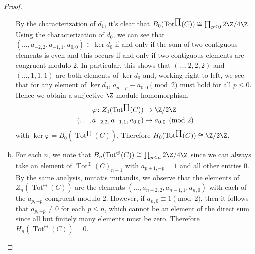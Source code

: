 \documentclass[10pt]{amsart}
\begin{document}
\begin{ex}
\begin{proof}
\begin{enumerate}[(a)]
      By the characterization of $d_1$, it's clear that $B_0(\operatorname{Tot}^{\prod}(C)) \cong \prod_{p \leq 0} 2\Z/4\Z$.
      Using the characterization of $d_0$, we can see that $(\ldots, a_{-2, 2}, a_{-1, 1}, a_{0, 0}) \in \ker d_0$ if and only if the sum of two contiguous elements is even and this occurs if and only if two contiguous elements are congruent modulo 2.
      In particular, this shows that $(\ldots, 2, 2, 2)$ and $(\ldots, 1, 1, 1)$ are both elements of $\ker d_0$ and, working right to left, we see that for any element of $\ker d_0$, $a_{p,-p} \equiv a_{0,0} \pmod{2}$ must hold for all $p \leq 0$.
      Hence we obtain a surjective $\Z$-module homomorphism
      \begin{align*}
        \varphi \colon Z_0(\operatorname{Tot}^{\prod}(C)) &\rightarrow \Z/2\Z\\
        (\ldots, a_{-2, 2}, a_{-1, 1}, a_{0, 0}) &\mapsto a_{0,0} \pmod{2}
      \end{align*}
      with $\ker\varphi = B_0(\operatorname{Tot}^{\prod}(C))$.
      Therefore $H_0(\operatorname{Tot}^{\prod}(C)) \cong \Z/2\Z$.
    \item
      For each $n$, we note that $B_n(\operatorname{Tot}^{\oplus}(C)) \cong \prod_{p \leq n} 2\Z/4\Z$ since we can always take an element of $\operatorname{Tot}^{\oplus}(C)_{n+1}$ with $a_{p+1, -p} = 1$ and all other entries 0.
      By the same analysis, mutatis mutandis, we observe that the elements of $Z_n(\operatorname{Tot}^{\oplus}(C))$ are the elements $(\ldots, a_{n-2,2}, a_{n-1,1}, a_{n,0})$ with each of the $a_{p,-p}$ congruent modulo $2$.
      However, if $a_{n,0} \equiv 1 \pmod{2}$, then it follows that $a_{p,-p} \neq 0$ for each $p \leq n$, which cannot be an element of the direct sum since all but finitely many elements must be zero.
      Therefore $H_n(\operatorname{Tot}^{\oplus}(C)) = 0$.
    \end{enumerate}
  \end{proof}
\end{ex}
\end{document}

